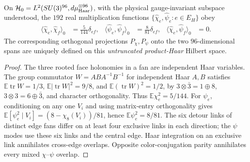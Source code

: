 \documentclass[12pt,a4paper]{article}
\begin{document}
\begin{proposition}
\label{p10:prop:v235-signed-haar-norms}
On \(\mathcal H_0=L^2(SU(3)^{96},d\mu_{\rm Haar}^{\otimes96})\),
with the physical gauge-invariant subspace understood, the \(192\)
real multiplication functions \(\{\widehat\chi_e,\widehat\psi_e:
e\in E_H\}\) obey
\[
 \begin{aligned}
 \langle\widehat\chi_e,\widehat\chi_f\rangle_0
   &=\tfrac5{144}\delta_{ef},&
 \langle\widehat\psi_e,\widehat\psi_f\rangle_0
   &=\tfrac8{81}\delta_{ef},&
 \langle\widehat\chi_e,\widehat\psi_f\rangle_0&=0.
 \end{aligned}
\]
The corresponding orthogonal projections \(P_\chi,P_\psi\)
onto the two \(96\)-dimensional spans are uniquely defined on
this \emph{untruncated product-Haar} Hilbert space.
\end{proposition}
\begin{proof}
The three rooted face holonomies in a fan are independent Haar
variables.  The group commutator \(W=ABA^{-1}B^{-1}\) for independent
Haar \(A,B\) satisfies
\(\mathbb E\operatorname{tr}W=1/3\),
\(\mathbb E|\operatorname{tr}W|^2=9/8\), and
\(\mathbb E(\operatorname{tr}W)^2=1/2\), by
\(3\otimes\bar3=1\oplus8\),
\(3\otimes3=6\oplus\bar3\), and character orthogonality.
Thus \(\mathbb E\chi_e^2=5/144\).
For \(\psi_e\), conditioning on any one \(V_i\) and using
matrix-entry orthogonality gives
\(\mathbb E[\psi_e^2\mid V_i]
=(8-\chi_8(V_i))/81\), hence \(\mathbb E\psi_e^2=8/81\).
The six detour links of distinct edge fans differ on at least four
exclusive links in each direction; the \(\psi\) modes use these six
links and the central edge.  Haar integration on an exclusive link
annihilates cross-edge overlaps.  Opposite color-conjugation parity
annihilates every mixed \(\chi\)--\(\psi\) overlap.
\end{proof}
\end{document}
